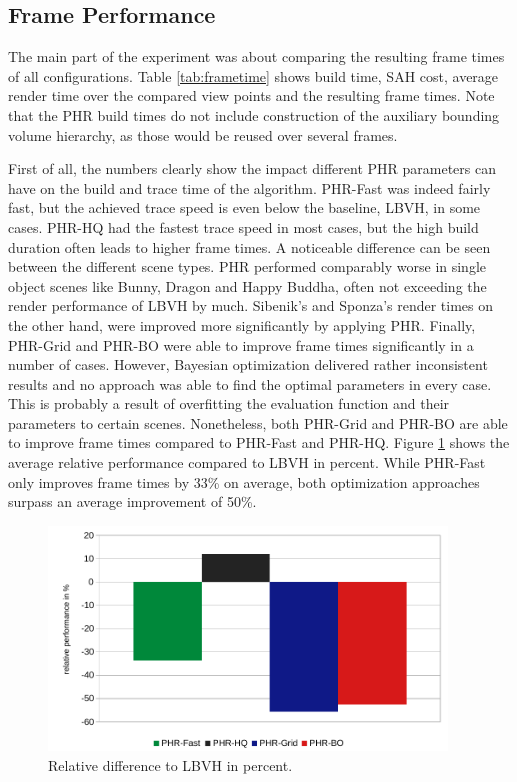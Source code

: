 \subsection{Frame Performance}
The main part of the experiment was about comparing the resulting frame times of all configurations. Table \ref{tab:frametime} shows build time, SAH cost, average render time over the compared view points and the resulting frame times. Note that the PHR build times do not include construction of the auxiliary bounding volume hierarchy, as those would be reused over several frames. 

First of all, the numbers clearly show the impact different PHR parameters can have on the build and trace time of the algorithm. PHR-Fast was indeed fairly fast, but the achieved trace speed is even below the baseline, LBVH, in some cases. PHR-HQ had the fastest trace speed in most cases, but the high build duration often leads to higher frame times. A noticeable difference can be seen between the different scene types. PHR performed comparably worse in single object scenes like Bunny, Dragon and Happy Buddha, often not exceeding the render performance of LBVH by much. Sibenik's and Sponza's render times on the other hand, were improved more significantly by applying PHR. Finally, PHR-Grid and PHR-BO were able to improve frame times significantly in a number of cases. However, Bayesian optimization delivered rather inconsistent results and no approach was able to find the optimal parameters in every case. This is probably a result of overfitting the evaluation function and their parameters to certain scenes. Nonetheless, both PHR-Grid and PHR-BO are able to improve frame times compared to PHR-Fast and PHR-HQ. Figure \ref{fig:difference} shows the average relative performance compared to LBVH in percent. While PHR-Fast only improves frame times by 33\% on average, both optimization approaches surpass an average improvement of 50\%.
\begin{figure} [H]
    \centering
    \includegraphics[width=300pt]{images/performance_difference.pdf}
    \caption{Relative difference to LBVH in percent.}
    \label{fig:difference}
\end{figure}
